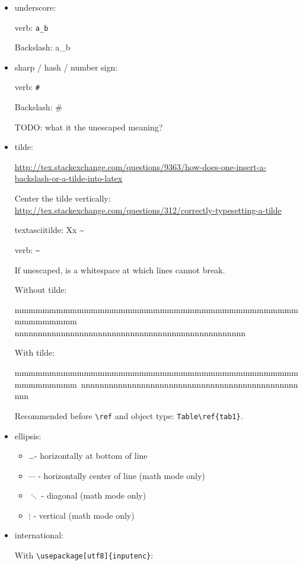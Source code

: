 \documentclass[12pt]{article}
\begin{document}
  \begin{itemize}

    \item underscore:

      verb: \verb|a_b|

      Backslash: a\_b

    \item sharp / hash / number sign:

      verb: \verb|#|

      Backslash: \#

      TODO: what it the unescaped meaning?

    \item tilde:

      \url{http://tex.stackexchange.com/questions/9363/how-does-one-insert-a-backslash-or-a-tilde-into-latex}

      Center the tilde vertically: \url{http://tex.stackexchange.com/questions/312/correctly-typesetting-a-tilde}

      textasciitilde: Xx \textasciitilde

      verb: \verb|~|

      If unescaped, is a whitespace at which lines cannot break.

      Without tilde:

      mmmmmmmmmmmmmmmmmmmmmmmmmmmmmmmmmmmmmmmmmmmmmmmmmm nnnnnnnnnnnnnnnnnnnnnnnnnnnnnnnnnnnnnnnnnnnnnnnnnn 

      With tilde:

      mmmmmmmmmmmmmmmmmmmmmmmmmmmmmmmmmmmmmmmmmmmmmmmmmm~nnnnnnnnnnnnnnnnnnnnnnnnnnnnnnnnnnnnnnnnnnnnnnnnnn 

      Recommended before \lstinline|\ref| and object type: \lstinline|Table\ref{tab1}|.

    \item ellipsis:
    \begin{itemize}
      \item  \ldots   - horizontally at bottom of line
      \item  $\cdots$ - horizontally center of line (math mode only)
      \item  $\ddots$ - diagonal (math mode only)
      \item  $\vdots$ - vertical (math mode only)
    \end{itemize}

    \item international:

      With \lstinline|\usepackage[utf8]{inputenc}|:


\end{itemize}
\end{document}
